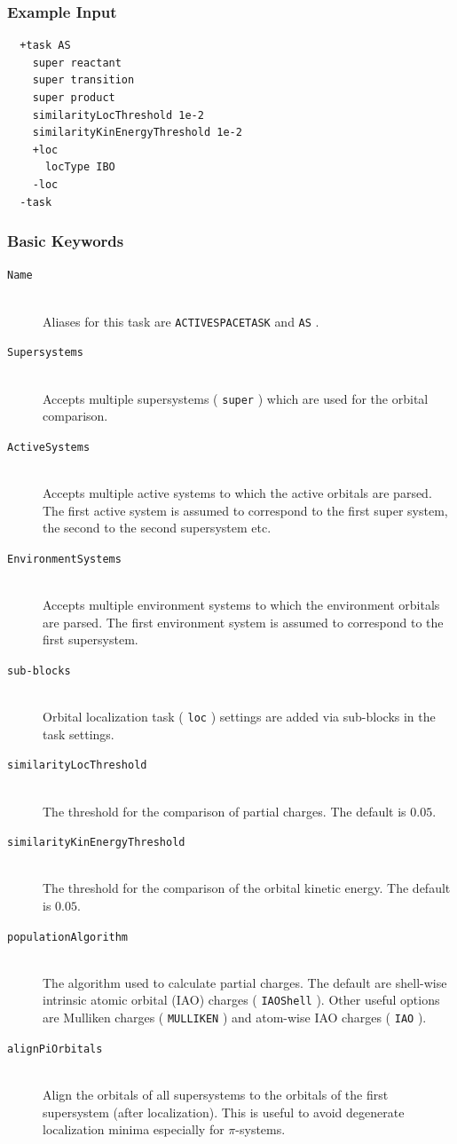 \documentclass[bibliography=totocnumbered,a4paper,10pt,oneside]{scrbook}
\newcommand{\ttt}[1]{%
  \begingroup\setlength{\fboxsep}{1pt}%
  \colorbox{serenity-green!30}{\texttt{\hspace*{2pt}\vphantom{(g}#1\hspace*{2pt}}}%
  \endgroup
}
\begin{document}
\subsubsection{Example Input}
\begin{lstlisting}
  +task AS
    super reactant  
    super transition
    super product
    similarityLocThreshold 1e-2
    similarityKinEnergyThreshold 1e-2
    +loc
      locType IBO
    -loc
  -task
 \end{lstlisting}
\subsubsection{Basic Keywords}
\begin{description}
 \item [\texttt{Name}]\hfill \\
 Aliases for this task are \ttt{ACTIVESPACETASK} and \ttt{AS}.  
 \item [\texttt{Supersystems}]\hfill \\
 Accepts multiple supersystems (\ttt{super}) which are used for the orbital comparison.   
 \item [\texttt{ActiveSystems}]\hfill \\
 Accepts multiple active systems to which the active orbitals are parsed. The first
 active system is assumed to correspond to the first super system, the second to the second
 supersystem etc. 
 \item [\texttt{EnvironmentSystems}]\hfill \\
 Accepts multiple environment systems to which the environment orbitals are parsed. The first
 environment system is assumed to correspond to the first supersystem. 
 \item [\texttt{sub-blocks}]\hfill \\
 Orbital localization task (\ttt{loc}) settings are added via sub-blocks in the task settings.
 \item [\texttt{similarityLocThreshold}]\hfill \\
 The threshold for the comparison of partial charges. The default is $0.05$.
 \item [\texttt{similarityKinEnergyThreshold}]\hfill \\
 The threshold for the comparison of the orbital kinetic energy. The default is $0.05$.
 \item [\texttt{populationAlgorithm}]\hfill \\
 The algorithm used to calculate partial charges. The default are shell-wise intrinsic atomic orbital (IAO)
 charges (\ttt{IAOShell}). Other useful options are Mulliken charges (\ttt{MULLIKEN}) and atom-wise IAO
 charges (\ttt{IAO}).
 \item [\texttt{alignPiOrbitals}]\hfill \\
 Align the orbitals of all supersystems to the orbitals of the first supersystem (after localization). This
 is useful to avoid degenerate localization minima especially for $\pi$-systems. 
\end{description}
\end{document}
